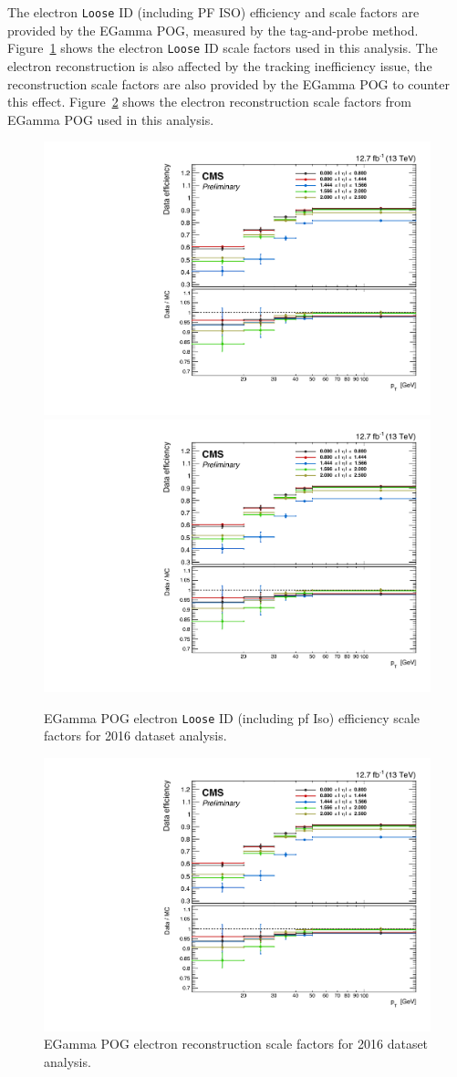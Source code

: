 \vspace{0.3cm}
The electron \texttt{Loose} ID (including PF ISO) efficiency and scale factors are provided by the EGamma POG, measured by the tag-and-probe method. Figure~\ref{fig:bg_eidsf} shows the electron \texttt{Loose} ID scale factors used in this analysis. The electron reconstruction is also affected by the tracking inefficiency issue, the reconstruction scale factors are also provided by the EGamma POG to counter this effect. Figure~\ref{fig:bg_gsfsf} shows the electron reconstruction scale factors from EGamma POG used in this analysis.  

\begin{figure}[htbp]
\centering
\includegraphics[width=0.66\linewidth, page=1]{figures/bg_elooseideff.pdf}
\includegraphics[width=0.66\linewidth, page=2]{figures/bg_elooseideff.pdf}
\caption{EGamma POG electron \texttt{Loose} ID (including pf Iso) efficiency scale factors for 2016 dataset analysis.}
\label{fig:bg_eidsf}
\end{figure}

\begin{figure}[htbp]
\centering
\includegraphics[width=0.66\linewidth, page=2]{figures/bg_erecoeff.pdf}
\caption{EGamma POG electron reconstruction scale factors for 2016 dataset analysis.}
\label{fig:bg_gsfsf}
\end{figure}


